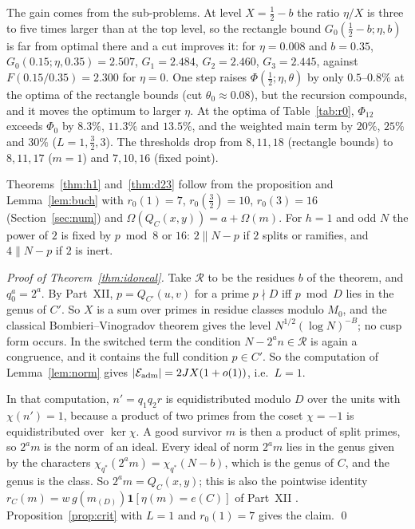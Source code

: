 \documentclass[11pt]{amsart}
\theoremstyle{remark}
\newcommand{\cE}{\mathcal E}
\begin{document}
The gain comes from the sub-problems. At level $X=\frac12-b$ the ratio $\eta/X$ is three to five times larger than at the top level, so the rectangle bound $G_0(\frac12-b;\eta,b)$ is far from optimal there and a cut improves it: for $\eta=0.008$ and $b=0.35$, $G_0(0.15;\eta,0.35)=2.507$, $G_1=2.484$, $G_2=2.460$, $G_3=2.445$, against $F(0.15/0.35)=2.300$ for $\eta=0$. One step raises $\Phi(\frac12;\eta,\theta)$ by only $0.5$--$0.8\%$ at the optima of the rectangle bounds (cut $\theta_0\approx0.08$), but the recursion compounds, and it moves the optimum to larger $\eta$. At the optima of Table~\ref{tab:r0}, $\Phi_{12}$ exceeds $\Phi_0$ by $8.3\%$, $11.3\%$ and $13.5\%$, and the weighted main term by $20\%$, $25\%$ and $30\%$ ($L=1,\frac32,3$). The thresholds drop from $8,11,18$ (rectangle bounds) to $8,11,17$ ($m=1$) and $7,10,16$ (fixed point).

Theorems~\ref{thm:h1} and~\ref{thm:d23} follow from the proposition and Lemma~\ref{lem:buch} with $r_0(1)=7$, $r_0(\frac32)=10$, $r_0(3)=16$ (Section~\ref{sec:num}) and $\Omega(Q_C(x,y))=a+\Omega(m)$. For $h=1$ and odd $N$ the power of $2$ is fixed by $p\bmod 8$ or $16$: $2\parallel N-p$ if $2$ splits or ramifies, and $4\parallel N-p$ if $2$ is inert.

\emph{Proof of Theorem~\ref{thm:idoneal}.} Take $\mathcal R$ to be the residues $b$ of the theorem, and $q_0^a=2^a$. By Part~XII, $p=Q_{C'}(u,v)$ for a prime $p\nmid D$ iff $p\bmod D$ lies in the genus of $C'$. So $X$ is a sum over primes in residue classes modulo $M_0$, and the classical Bombieri--Vinogradov theorem gives the level $N^{1/2}(\log N)^{-B}$; no cusp form occurs. In the switched term the condition $N-2^an\in\mathcal R$ is again a congruence, and it contains the full condition $p\in C'$. So the computation of Lemma~\ref{lem:norm} gives $|\cE_{\rm adm}|=2JX(1+o(1))$, i.e.\ $L=1$.

In that computation, $n'=q_1q_2r$ is equidistributed modulo $D$ over the units with $\chi(n')=1$, because a product of two primes from the coset $\chi=-1$ is equidistributed over $\ker\chi$. A good survivor $m$ is then a product of split primes, so $2^am$ is the norm of an ideal. Every ideal of norm $2^am$ lies in the genus given by the characters $\chi_{q^*}(2^am)=\chi_{q^*}(N-b)$, which is the genus of $C$, and the genus is the class. So $2^am=Q_C(x,y)$; this is also the pointwise identity $r_C(m)=w\,g(m_{(D)})\mathbf 1[\eta(m)=e(C)]$ of Part~XII \cite[Lemma~2.1]{ChenXII}. Proposition~\ref{prop:crit} with $L=1$ and $r_0(1)=7$ gives the claim. \qed
\end{document}
